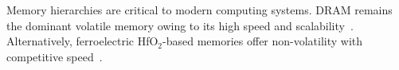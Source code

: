 
\noindent
Memory hierarchies are critical to modern computing systems. 
DRAM remains the dominant volatile memory owing to its high speed and scalability~\cite{choi2022, iedm2023_dram}. 
Alternatively, ferroelectric HfO$_2$-based memories offer non-volatility with competitive speed~\cite{boscke2011, noheda2023}. 
